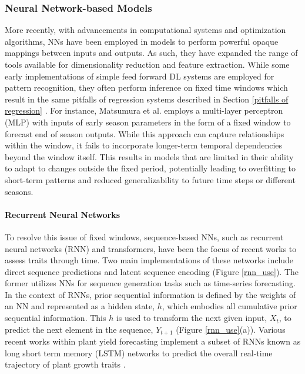 \documentclass{article}
\begin{document}


\subsubsection{Neural Network-based Models}
More recently, with advancements in computational systems and optimization algorithms, NNs have been employed in models to perform powerful opaque mappings between inputs and outputs. As such, they have expanded the range of tools available for dimensionality reduction and feature extraction. While some early implementations of simple feed forward DL systems are employed for pattern recognition, they often perform inference on fixed time windows which result in the same pitfalls of regression systems described in Section \ref{pitfalls of regression} \cite{hewamalage2023forecast}. For instance, Matsumura et al. \cite{MATSUMURA2015} employs a multi-layer perceptron (MLP) with inputs of early season parameters in the form of a fixed window to forecast end of season outputs. While this approach can capture relationships within the window, it fails to incorporate longer-term temporal dependencies beyond the window itself. This results in models that are limited in their ability to adapt to changes outside the fixed period, potentially leading to overfitting to short-term patterns and reduced generalizability to future time steps or different seasons.

\paragraph{Recurrent Neural Networks}
\label{rnn}
To resolve this issue of fixed windows, sequence-based NNs, such as recurrent neural networks (RNN) and transformers, have been the focus of recent works to assess traits through time. Two main implementations of these networks include direct sequence predictions and latent sequence encoding (Figure \ref{rnn_use}). The former utilizes NNs for sequence generation tasks such as time-series forecasting. In the context of RNNs, prior sequential information is defined by the weights of an NN and represented as a hidden state, $h$, which embodies all cumulative prior sequential information. This $h$ is used to transform the next given input, $X_t$, to predict the next element in the sequence, $Y_{t+1}$ (Figure \ref{rnn_use}(a)). Various recent works within plant yield forecasting implement a subset of RNNs known as long short term memory (LSTM) networks to predict the overall real-time trajectory of plant growth traits \cite{lee2021development,alhnaity2019using}.
\end{document}
